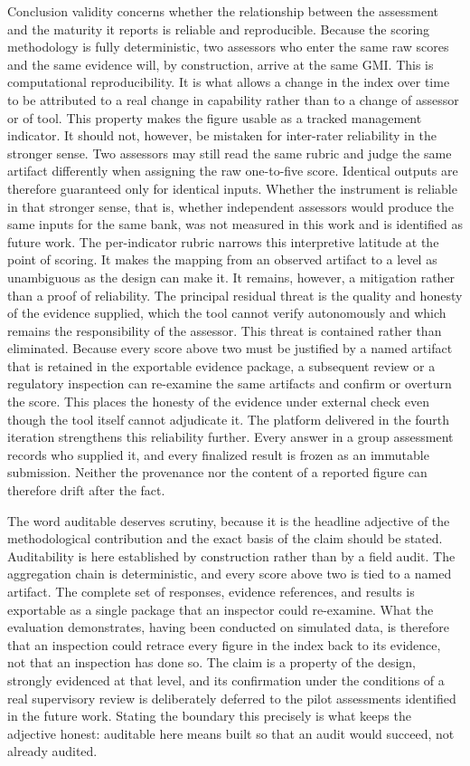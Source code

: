 Conclusion validity concerns whether the relationship between the assessment and the maturity it reports is reliable and reproducible. Because the scoring methodology is fully deterministic, two assessors who enter the same raw scores and the same evidence will, by construction, arrive at the same GMI. This is computational reproducibility. It is what allows a change in the index over time to be attributed to a real change in capability rather than to a change of assessor or of tool. This property makes the figure usable as a tracked management indicator. It should not, however, be mistaken for inter-rater reliability in the stronger sense. Two assessors may still read the same rubric and judge the same artifact differently when assigning the raw one-to-five score. Identical outputs are therefore guaranteed only for identical inputs. Whether the instrument is reliable in that stronger sense, that is, whether independent assessors would produce the same inputs for the same bank, was not measured in this work and is identified as future work. The per-indicator rubric narrows this interpretive latitude at the point of scoring. It makes the mapping from an observed artifact to a level as unambiguous as the design can make it. It remains, however, a mitigation rather than a proof of reliability. The principal residual threat is the quality and honesty of the evidence supplied, which the tool cannot verify autonomously and which remains the responsibility of the assessor. This threat is contained rather than eliminated. Because every score above two must be justified by a named artifact that is retained in the exportable evidence package, a subsequent review or a regulatory inspection can re-examine the same artifacts and confirm or overturn the score. This places the honesty of the evidence under external check even though the tool itself cannot adjudicate it. The platform delivered in the fourth iteration strengthens this reliability further. Every answer in a group assessment records who supplied it, and every finalized result is frozen as an immutable submission. Neither the provenance nor the content of a reported figure can therefore drift after the fact.

The word auditable deserves scrutiny, because it is the headline adjective of the methodological contribution and the exact basis of the claim should be stated. Auditability is here established by construction rather than by a field audit. The aggregation chain is deterministic, and every score above two is tied to a named artifact. The complete set of responses, evidence references, and results is exportable as a single package that an inspector could re-examine. What the evaluation demonstrates, having been conducted on simulated data, is therefore that an inspection could retrace every figure in the index back to its evidence, not that an inspection has done so. The claim is a property of the design, strongly evidenced at that level, and its confirmation under the conditions of a real supervisory review is deliberately deferred to the pilot assessments identified in the future work. Stating the boundary this precisely is what keeps the adjective honest: auditable here means built so that an audit would succeed, not already audited.

